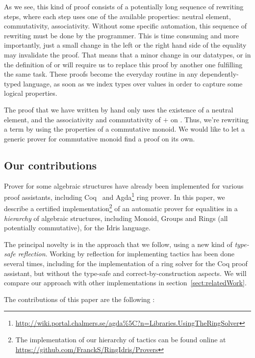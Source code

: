 As we see, this kind of proof consists of a potentially long sequence of rewriting steps, where each step uses one of the available properties: neutral element, commutativity, associativity. Without some specific automation, this sequence of rewriting must be done by the programmer.
This is time consuming and more importantly, just a small change in the left or the right hand side of the equality may invalidate the proof. That means that a minor change in our datatypes, or in the definition of  or  will require us to replace this proof by another one fulfilling the same task.
These proofs become the everyday routine in any dependently-typed language, as soon as we index types over values in order to capture some logical properties.  

The proof that we have written by hand only uses the existence of a neutral element, and the associativity and commutativity of $+$ on . Thus, we're rewriting a term by using the properties of a commutative monoid. We would like to let a generic prover for commutative monoid find a proof on its own.

\subsection{Our contributions}

Prover for some algebraic structures have already been implemented for various proof assistants, including Coq~\cite{Coq2005} and Agda\footnote{\url{http://wiki.portal.chalmers.se/agda\%5C?n=Libraries.UsingTheRingSolver}} ring prover. In this paper, we describe a certified
implementation\footnote{The implementation of our hierarchy of tactics can be found online at \url{https://github.com/FranckS/RingIdris/Provers}} of an automatic prover for equalities in a \emph{hierarchy} of algebraic
structures, including Monoid, Groups and Rings (all potentially commutative),
for the Idris language. 

The principal novelty is in the approach that we follow, using a
new kind of \emph{type-safe reflection}.  Working by reflection for implementing tactics has been done several times, including for the implementation of a ring solver for the Coq proof assistant, but without the type-safe and correct-by-construction aspects. We will
compare our approach with other implementations in section~\ref{sect:relatedWork}.

The contributions of this paper are the following :

